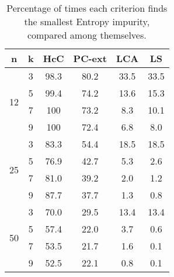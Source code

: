 \begin{table}
\centering
\begin{tabular}{c|c|c|c|c|c} 
        n            &    k        &   HcC   &   PC-ext   &   LCA   &   LS   \\
\hline
\multirow{4}{*}{12}  &    3        &   98.3  &   80.2     &   33.5  &  33.5  \\
                     &    5        &   99.4  &   74.2     &   13.6  &  15.3  \\
                     &    7        &   100   &   73.2     &    8.3  &  10.1  \\
                     &    9        &   100   &   72.4     &    6.8  &   8.0  \\
\hline
\multirow{4}{*}{25}  &    3        &   83.3  &   54.4     &   18.5  &  18.5  \\
                     &    5        &   76.9  &   42.7     &    5.3  &   2.6  \\
                     &    7        &   81.0  &   39.2     &    2.0  &   1.2  \\
                     &    9        &   87.7  &   37.7     &    1.3  &   0.8  \\
\hline
\multirow{4}{*}{50}  &    3        &   70.0  &   29.5     &   13.4  &  13.4  \\
                     &    5        &   57.4  &   22.0     &    3.7  &   0.6  \\
                     &    7        &   53.5  &   21.7     &    1.6  &   0.1  \\
                     &    9        &   52.5  &   22.1     &    0.8  &   0.1
\end{tabular}
\caption{Percentage of times each criterion finds the smallest Entropy impurity, compared among themselves.}
\label{tab:Splits-Entropy}
\end{table}


